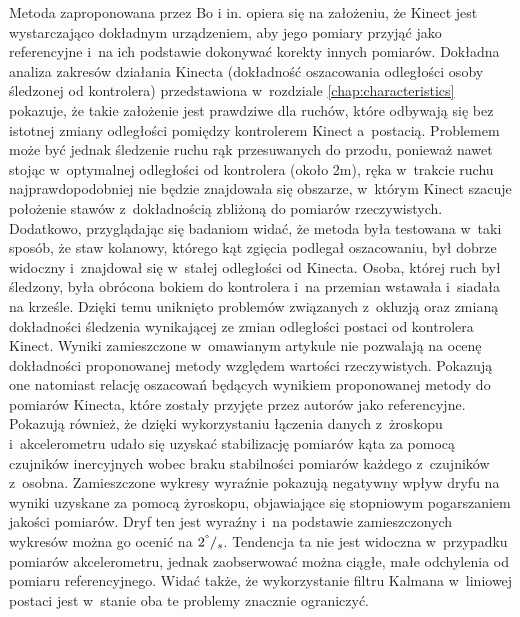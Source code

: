 Metoda zaproponowana przez Bo i in. opiera się na założeniu, że Kinect jest wystarczająco dokładnym urządzeniem, aby jego pomiary przyjąć jako referencyjne i~na ich podstawie dokonywać korekty innych pomiarów. Dokładna analiza zakresów działania Kinecta (dokładność oszacowania odległości osoby śledzonej od kontrolera) przedstawiona w~rozdziale \ref{chap:characteristics} pokazuje, że takie założenie jest prawdziwe dla ruchów, które odbywają się bez istotnej zmiany odległości pomiędzy kontrolerem Kinect a~postacią. Problemem może być jednak śledzenie ruchu rąk przesuwanych do przodu, ponieważ nawet stojąc w~optymalnej odległości od kontrolera (około 2m), ręka w~trakcie ruchu najprawdopodobniej nie będzie znajdowała się obszarze, w~którym Kinect szacuje położenie stawów z~dokładnością zbliżoną do pomiarów rzeczywistych. Dodatkowo, przyglądając się badaniom widać, że metoda była testowana w~taki sposób, że staw kolanowy, którego kąt zgięcia podlegał oszacowaniu, był dobrze widoczny i~znajdował się w~stałej odległości od Kinecta. Osoba, której ruch był śledzony, była obrócona bokiem do kontrolera i~na przemian wstawała i~siadała na krześle. Dzięki temu uniknięto problemów związanych z~okluzją oraz zmianą dokładności śledzenia wynikającej ze zmian odległości postaci od kontrolera Kinect.																																																	
Wyniki zamieszczone w~omawianym artykule \cite{Bo2011a} nie pozwalają na ocenę dokładności proponowanej metody względem wartości rzeczywistych. Pokazują one natomiast relację oszacowań będących wynikiem proponowanej metody do pomiarów Kinecta, które zostały przyjęte przez autorów jako referencyjne. Pokazują również, że dzięki wykorzystaniu łączenia danych z~żroskopu i~akcelerometru udało się uzyskać stabilizację pomiarów kąta za pomocą czujników inercyjnych wobec braku stabilności pomiarów każdego z~czujników z~osobna. Zamieszczone wykresy wyraźnie pokazują negatywny wpływ dryfu na wyniki uzyskane za pomocą żyroskopu, objawiające się stopniowym pogarszaniem jakości pomiarów. Dryf ten jest wyraźny i~na podstawie zamieszczonych wykresów można go ocenić na $2^\degree/_s$. Tendencja ta nie jest widoczna w~przypadku pomiarów akcelerometru, jednak zaobserwować można ciągłe, małe odchylenia od pomiaru referencyjnego. Widać także, że wykorzystanie filtru Kalmana w~liniowej postaci jest w~stanie oba te problemy znacznie ograniczyć.																																																	
